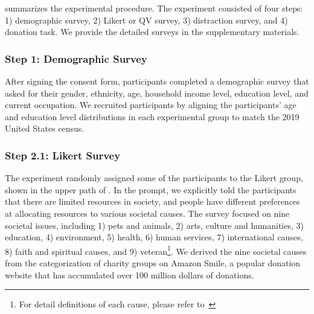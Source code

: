  summarizes the experimental procedure. The experiment consisted of four steps: 1) demographic survey, 2) Likert or QV survey, 3) distraction survey, and 4) donation task. We provide the detailed surveys in the supplementary materials.


\subsubsection{Step 1: Demographic Survey}
After signing the consent form, participants completed a demographic survey that asked for their gender, ethnicity, age, household income level, education level, and current occupation. We recruited participants by aligning the participants' age and education level distributions in each experimental group to match the 2019 United States census. 

\subsubsection{Step 2.1: Likert Survey}
The experiment randomly assigned some of the participants to the Likert group, shown in the upper path of . In the prompt, we explicitly told the participants that there are limited resources in society, and people have different preferences at allocating resources to various societal causes. The survey focused on nine societal issues, including 1) pets and animals, 2) arts, culture and humanities, 3) education, 4) environment, 5) health, 6) human services, 7) international causes, 8) faith and spiritual causes, and 9) veteran\footnote{For detail definitions of each cause, please refer to~}. We derived the nine societal causes from the categorization of charity groups on Amazon Smile, a popular donation website that has accumulated over 100 million dollars of donations.

